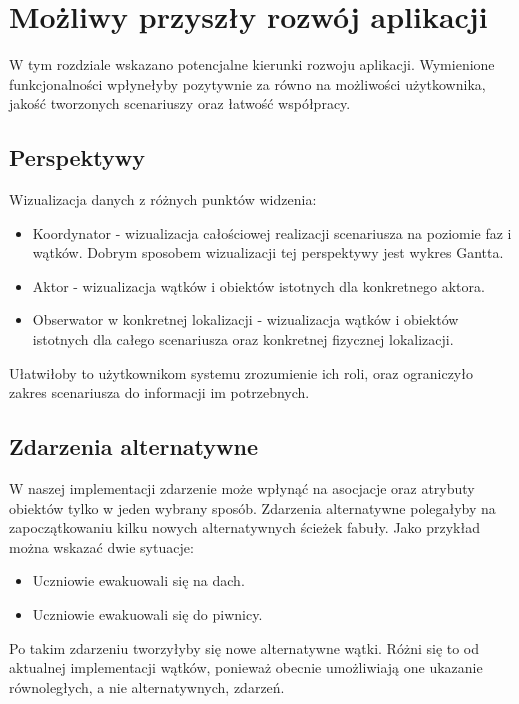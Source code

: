 \chapter{Możliwy przyszły rozwój aplikacji}

W tym rozdziale wskazano potencjalne kierunki rozwoju aplikacji. Wymienione funkcjonalności wpłynełyby pozytywnie za równo na
możliwości użytkownika, jakość tworzonych scenariuszy oraz łatwość współpracy.

\section{Perspektywy}

Wizualizacja danych z różnych punktów widzenia:
\begin{itemize}
    \item Koordynator - wizualizacja całościowej realizacji scenariusza na poziomie faz i wątków. Dobrym sposobem wizualizacji tej
    perspektywy jest wykres Gantta.
    \item Aktor - wizualizacja wątków i obiektów istotnych dla konkretnego aktora.
    \item Obserwator w konkretnej lokalizacji - wizualizacja wątków i obiektów istotnych dla całego scenariusza oraz konkretnej fizycznej lokalizacji.
\end{itemize}

Ułatwiłoby to użytkownikom systemu zrozumienie ich roli, oraz ograniczyło zakres scenariusza do informacji im potrzebnych.

\section{Zdarzenia alternatywne}

W naszej implementacji zdarzenie 
może wpłynąć na asocjacje oraz atrybuty obiektów tylko w jeden wybrany sposób. Zdarzenia alternatywne polegałyby na 
zapoczątkowaniu kilku nowych alternatywnych ścieżek fabuły. 
\noindent Jako przykład można wskazać dwie sytuacje:
\begin{itemize}
    \item Uczniowie ewakuowali się na dach.
    \item Uczniowie ewakuowali się do piwnicy.
\end{itemize}
\noindent Po takim zdarzeniu tworzyłyby się nowe alternatywne wątki. Różni się to od aktualnej implementacji wątków, 
ponieważ obecnie umożliwiają one ukazanie równoległych, a nie alternatywnych, zdarzeń.

